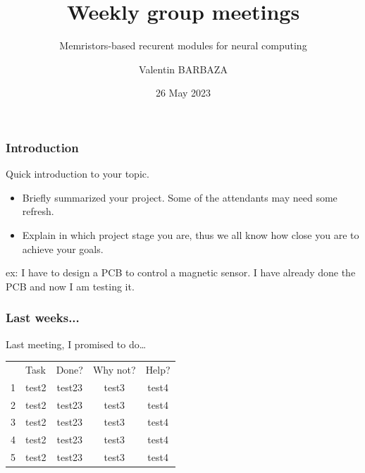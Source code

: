 \documentclass[table]{beamer}
\title[Group Meeting]
{Weekly group meetings}
\subtitle{Memristors-based recurent modules for neural computing}
\author[V. BARBAZA]{Valentin BARBAZA}
\date[26 May] %
{26 May 2023}
\begin{document}
\frame{\titlepage}


\begin{frame}
  \frametitle{Introduction}
  Quick introduction to your topic.

  \begin{itemize}
      \color{text}
    \item Briefly summarized your project. Some of the attendants may need some refresh.
    \item Explain in which project stage you are, thus we all know how close you are to achieve your goals.
  \end{itemize}

  ex: I have to design a PCB to control a magnetic sensor. I have already done the PCB and now I am testing it.
\end{frame}


\begin{frame}
  \frametitle{Last weeks...}

  Last meeting, I promised to do…

  \centering
  \begin{tabular}{ c m{3cm} c c c }
    \rowcolor{firstRow}
    & \centering\color{white}Task & \color{white}Done? & \color{white}Why not? & \color{white}Help? \\
    1 & test2 & test23 & test3 & test4\\
    2 & test2 & test23 & test3 & test4\\
    3 & test2 & test23 & test3 & test4\\
    4 & test2 & test23 & test3 & test4\\
    5 & test2 & test23 & test3 & test4\\
  \end{tabular}

\end{frame}

\begin{frame}
  \frametitle{}
\end{frame}
\end{document}
